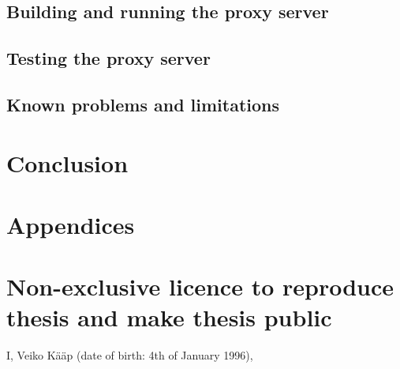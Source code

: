 \documentclass{style/bachelor-thesis}
\begin{document}
\subsection{Building and running the proxy server}
\label{sec:impl_buildrun}


\subsection{Testing the proxy server}

\subsection{Known problems and limitations}
\label{sec:impl_limitations}

\clearpage
\section{Conclusion} 



\newpage

{}


\newpage

\appendix
\section*{Appendices}
\renewcommand{\thesubsection}{\Alph{subsection}}

\pagebreak
\section*{\small Non-exclusive licence to reproduce thesis and make thesis public}


I, Veiko Kääp (date of birth: 4th of January 1996),
\end{document}
